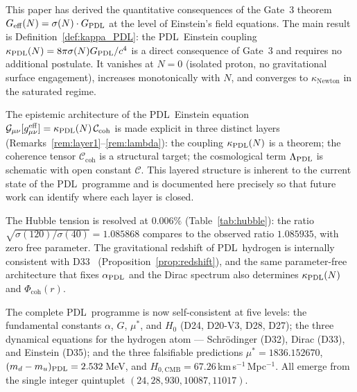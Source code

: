 \documentclass[11pt,a4paper]{article}
\theoremstyle{definition}
\newcommand{\PDL}{\textnormal{PDL}}
\newcommand{\aPDL}{\alpha_{\PDL}}
\newcommand{\GPDL}{G_{\PDL}}
\newcommand{\Geff}{G_{\mathrm{eff}}}
\newcommand{\sig}{\sigma}
\newcommand{\kPDL}{\kappa_{\PDL}}
\newcommand{\Ccoh}{\mathcal{C}_{\mathrm{coh}}}
\newcommand{\geff}{g^{\mathrm{eff}}_{\mu\nu}}
\newcommand{\Gcal}{\mathcal{G}_{\mu\nu}}
\newcommand{\Phicoh}{\Phi_{\mathrm{coh}}}
\begin{document}
This paper has derived the quantitative consequences of the Gate~3 theorem $\Geff(N) = \sig(N)\cdot\GPDL$ at the level of Einstein's field equations. The main result is Definition~\ref{def:kappa_PDL}: the \PDL\ Einstein coupling $\kPDL(N) = 8\pi\sig(N)\GPDL/c^4$ is a direct consequence of Gate~3 and requires no additional postulate. It vanishes at $N = 0$ (isolated proton, no gravitational surface engagement), increases monotonically with $N$, and converges to $\kappa_{\mathrm{Newton}}$ in the saturated regime.

The epistemic architecture of the \PDL\ Einstein equation $\Gcal[\geff] = \kPDL(N)\,\Ccoh$ is made explicit in three distinct layers (Remarks~\ref{rem:layer1}--\ref{rem:lambda}): the coupling $\kPDL(N)$ is a theorem; the coherence tensor $\Ccoh$ is a structural target; the cosmological term $\Lambda_{\PDL}$ is schematic with open constant $\mathcal{C}$. This layered structure is inherent to the current state of the \PDL\ programme and is documented here precisely so that future work can identify where each layer is closed.

The Hubble tension is resolved at $0.006\%$ (Table~\ref{tab:hubble}): the ratio $\sqrt{\sig(120)/\sig(40)} = 1.085868$ compares to the observed ratio $1.085935$, with zero free parameter. The gravitational redshift of \PDL\ hydrogen is internally consistent with D33~\cite{PDL_D33_2026} (Proposition~\ref{prop:redshift}), and the same parameter-free architecture that fixes $\aPDL$ and the Dirac spectrum also determines $\kPDL(N)$ and $\Phicoh(r)$.

The complete \PDL\ programme is now self-consistent at five levels: the fundamental constants $\alpha$, $G$, $\mu^*$, and $H_0$ (D24, D20-V3, D28, D27); the three dynamical equations for the hydrogen atom --- Schr\"odinger (D32), Dirac (D33), and Einstein (D35); and the three falsifiable predictions $\mu^* = 1836.152670$, $(m_d - m_u)_{\PDL} = 2.532$\,MeV, and $H_{0,\mathrm{CMB}} = 67.26$\,km\,s$^{-1}$\,Mpc$^{-1}$. All emerge from the single integer quintuplet $(24, 28, 930, 10087, 11017)$.


\nocite{*}

\end{document}
